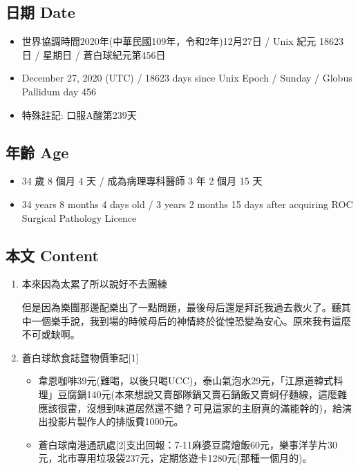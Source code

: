 \documentclass[a5paper, 11pt
]{book}
\providecommand{\tightlist}{%
  \setlength{\itemsep}{0pt}\setlength{\parskip}{0pt}}
\begin{document}
\hypertarget{ux65e5ux671f-date-26}{%
\subsection{日期 Date}\label{ux65e5ux671f-date-26}}

\begin{itemize}
\tightlist
\item
  世界協調時間2020年(中華民國109年，令和2年)12月27日 / Unix 紀元 18623
  日 / 星期日 / 蒼白球紀元第456日
\item
  December 27, 2020 (UTC) / 18623 days since Unix Epoch / Sunday /
  Globus Pallidum day 456
\item
  特殊註記: 口服A酸第239天
\end{itemize}

\hypertarget{ux5e74ux9f61-age-26}{%
\subsection{年齡 Age}\label{ux5e74ux9f61-age-26}}

\begin{itemize}
\tightlist
\item
  34 歲 8 個月 4 天 / 成為病理專科醫師 3 年 2 個月 15 天
\item
  34 years 8 months 4 days old / 3 years 2 months 15 days after
  acquiring ROC Surgical Pathology Licence
\end{itemize}

\hypertarget{ux672cux6587-content-26}{%
\subsection{本文 Content}\label{ux672cux6587-content-26}}

\begin{enumerate}
\def\labelenumi{\arabic{enumi}.}
\item
  本來因為太累了所以說好不去團練

  但是因為樂團那邊配樂出了一點問題，最後母后還是拜託我過去救火了。聽其中一個樂手說，我到場的時候母后的神情終於從惶恐變為安心。原來我有這麼不可或缺啊。
\item
  蒼白球飲食誌暨物價筆記{[}1{]}

  \begin{itemize}
  \tightlist
  \item
    韋恩咖啡39元(難喝，以後只喝UCC)，泰山氣泡水29元，「江原道韓式料理」豆腐鍋140元(本來想說又賣部隊鍋又賣石鍋飯又賣蚵仔麵線，這麼雜應該很雷，沒想到味道居然還不錯？可見這家的主廚真的滿能幹的)，給演出投影片製作人的排版費1000元。
  \item
    蒼白球南港通訊處{[}2{]}支出回報：7-11麻婆豆腐燴飯60元，樂事洋芋片30元，北市專用垃圾袋237元，定期悠遊卡1280元(那種一個月的)。
  \end{itemize}
\end{enumerate}
\end{document}
